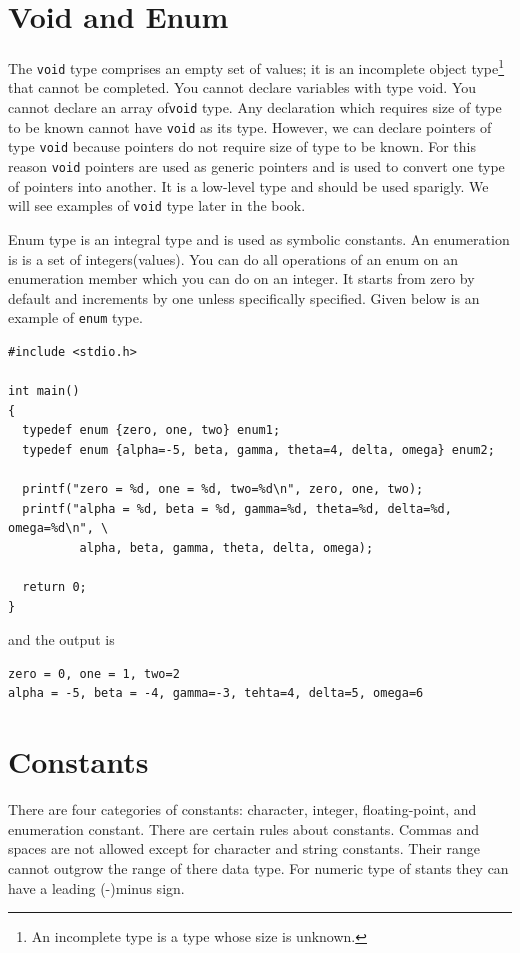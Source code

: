 \section{Void and Enum}
The \texttt{void} type comprises an empty set of values; it is an incomplete
object type\footnote{An incomplete type is a type whose size is unknown.} that
cannot be completed. You cannot declare variables with type void. You cannot
declare an array of\texttt{void} type. Any declaration which requires size of
type to be known cannot have \texttt{void} as its type. However, we can declare
pointers of type \texttt{void} because pointers do not require size of type to
be known. For this reason \texttt{void} pointers are used as generic pointers
and is used to convert one type of pointers into another. It is a low-level
type and should be used sparigly. We will see examples of \texttt{void} type
later in the book.

Enum type is an integral type and is used as symbolic constants. An enumeration
is is a set of integers(values). You can do all operations of an enum on an
enumeration member which you can do on an integer. It starts from zero by
default and increments by one unless specifically specified. Given below is an
example of \texttt{enum} type.

\begin{Verbatim}[frame=single]
#include <stdio.h>

int main()
{
  typedef enum {zero, one, two} enum1;
  typedef enum {alpha=-5, beta, gamma, theta=4, delta, omega} enum2;

  printf("zero = %d, one = %d, two=%d\n", zero, one, two);
  printf("alpha = %d, beta = %d, gamma=%d, theta=%d, delta=%d, omega=%d\n", \
          alpha, beta, gamma, theta, delta, omega);

  return 0;
}
\end{Verbatim}

and the output is

\begin{Verbatim}[frame=single]
zero = 0, one = 1, two=2
alpha = -5, beta = -4, gamma=-3, tehta=4, delta=5, omega=6
\end{Verbatim}

\section{Constants}
There are four categories of constants: character, integer, floating-point, and
enumeration constant. There are certain rules about constants. Commas and
spaces are not allowed except for character and string constants. Their range
cannot outgrow the range of there data type. For numeric type of stants they
can have a leading (-)minus sign.

